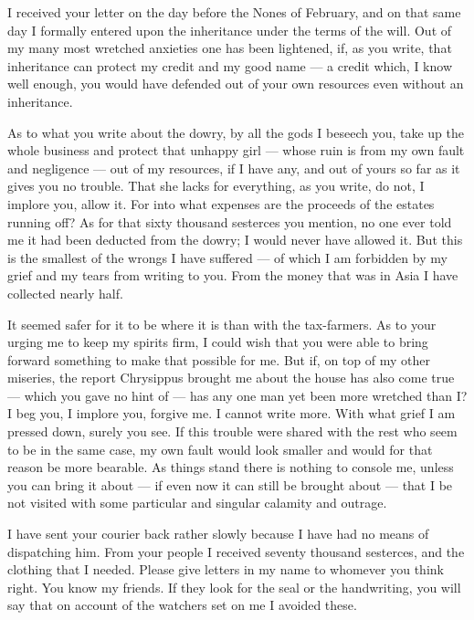 

 I received your letter on the day before the Nones of February, and on that same day I formally entered upon the inheritance under the terms of the will. Out of my many most wretched anxieties one has been lightened, if, as you write, that inheritance can protect my credit and my good name --- a credit which, I know well enough, you would have defended out of your own resources even without an inheritance.

 As to what you write about the dowry, by all the gods I beseech you, take up the whole business and protect that unhappy girl --- whose ruin is from my own fault and negligence --- out of my resources, if I have any, and out of yours so far as it gives you no trouble. That she lacks for everything, as you write, do not, I implore you, allow it. For into what expenses are the proceeds of the estates running off? As for that sixty thousand sesterces you mention, no one ever told me it had been deducted from the dowry; I would never have allowed it. But this is the smallest of the wrongs I have suffered --- of which I am forbidden by my grief and my tears from writing to you. From the money that was in Asia I have collected nearly half.

 It seemed safer for it to be where it is than with the tax-farmers. As to your urging me to keep my spirits firm, I could wish that you were able to bring forward something to make that possible for me. But if, on top of my other miseries, the report Chrysippus brought me about the house has also come true --- which you gave no hint of --- has any one man yet been more wretched than I? I beg you, I implore you, forgive me. I cannot write more. With what grief I am pressed down, surely you see. If this trouble were shared with the rest who seem to be in the same case, my own fault would look smaller and would for that reason be more bearable. As things stand there is nothing to console me, unless you can bring it about --- if even now it can still be brought about --- that I be not visited with some particular and singular calamity and outrage.

 I have sent your courier back rather slowly because I have had no means of dispatching him. From your people I received seventy thousand sesterces, and the clothing that I needed. Please give letters in my name to whomever you think right. You know my friends. If they look for the seal or the handwriting, you will say that on account of the watchers set on me I avoided these.
